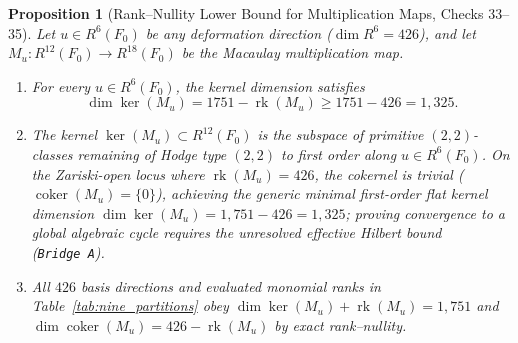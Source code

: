 \documentclass[11pt,a4paper]{article}
\newtheorem{proposition}[theorem]{Proposition}
\theoremstyle{definition}
\theoremstyle{remark}
\DeclareMathOperator{\rk}{rk}
\DeclareMathOperator{\coker}{coker}
\begin{document}
\begin{proposition}[Rank--Nullity Lower Bound for Multiplication Maps, Checks 33--35]
Let $u \in R^6(F_0)$ be any deformation direction ($\dim R^6 = 426$), and let $M_u : R^{12}(F_0) \to R^{18}(F_0)$ be the Macaulay multiplication map.
\begin{enumerate}[label=(\roman*)]
\item For every $u \in R^6(F_0)$, the kernel dimension satisfies
\begin{equation}
\dim \ker(M_u) = 1751 - \rk(M_u) \ge 1751 - 426 = 1,325.
\end{equation}
\item The kernel $\ker(M_u) \subset R^{12}(F_0)$ is the subspace of primitive $(2,2)$-classes remaining of Hodge type $(2,2)$ to first order along $u \in R^6(F_0)$. On the Zariski-open locus where $\rk(M_u) = 426$, the cokernel is trivial ($\coker(M_u) = \{0\}$), achieving the generic minimal first-order flat kernel dimension $\dim \ker(M_u) = 1{,}751 - 426 = 1{,}325$; proving convergence to a global algebraic cycle requires the unresolved effective Hilbert bound (\texttt{Bridge~A}).
\item All $426$ basis directions and evaluated monomial ranks in Table~\ref{tab:nine_partitions} obey $\dim\ker(M_u) + \rk(M_u) = 1,751$ and $\dim\coker(M_u) = 426 - \rk(M_u)$ by exact rank--nullity.
\end{enumerate}
\end{proposition}
\end{document}
